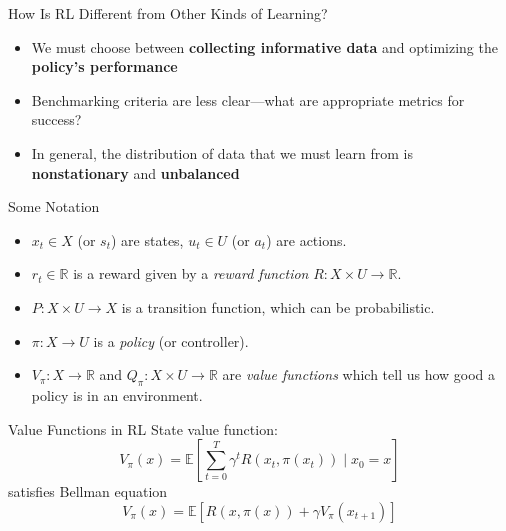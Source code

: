 \documentclass{beamer}
\begin{document}
\begin{frame}{How Is RL Different from Other Kinds of Learning?}
  \begin{itemize}
    \item We must choose between \textbf{collecting informative data} and optimizing the \textbf{policy's performance}
    \item Benchmarking criteria are less clear---what are appropriate metrics for success?
    \item In general, the distribution of data that we must learn from is \textbf{nonstationary} and \textbf{unbalanced}
  \end{itemize}
\end{frame}

\begin{frame}{Some Notation}
  \begin{itemize}
    \item $x_t \in X$ (or $s_t$) are states, $u_t \in U$ (or $a_t$) are actions. 
    \item $r_t \in \mathbb{R}$ is a reward given by a \emph{reward function} $R : X \times U \rightarrow \mathbb{R}$.
    \item $P: X \times U \rightarrow X$ is a transition function, which can be probabilistic.
    \item $\pi: X \rightarrow U$ is a \emph{policy} (or controller).
    \item $V_\pi: X \rightarrow \mathbb{R}$ and $Q_\pi: X \times U \rightarrow \mathbb{R}$ are \emph{value functions} which tell us how good a policy is in an environment.
  \end{itemize}
\end{frame}

\begin{frame}{Value Functions in RL}
  State value function:
  \begin{equation}
    V_\pi(x) = \mathbb{E}\left[\sum_{t=0}^T \gamma^t R(x_t, \pi(x_t)) \mid x_0 = x\right]
  \end{equation}
  satisfies Bellman equation
  \begin{equation}
    V_\pi(x) = \mathbb{E}\left[R(x, \pi(x)) + \gamma V_\pi(x_{t+1})\right]
  \end{equation}
\end{frame}
\end{document}
